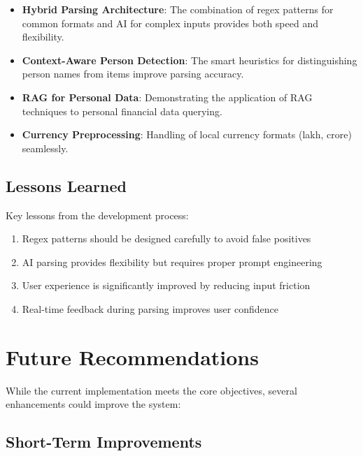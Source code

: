 \begin{itemize}
    \item \textbf{Hybrid Parsing Architecture}: The combination of regex patterns for common formats and AI for complex inputs provides both speed and flexibility.
    
    \item \textbf{Context-Aware Person Detection}: The smart heuristics for distinguishing person names from items improve parsing accuracy.
    
    \item \textbf{RAG for Personal Data}: Demonstrating the application of RAG techniques to personal financial data querying.
    
    \item \textbf{Currency Preprocessing}: Handling of local currency formats (lakh, crore) seamlessly.
\end{itemize}

\subsection{Lessons Learned}

Key lessons from the development process:

\begin{enumerate}
    \item Regex patterns should be designed carefully to avoid false positives
    \item AI parsing provides flexibility but requires proper prompt engineering
    \item User experience is significantly improved by reducing input friction
    \item Real-time feedback during parsing improves user confidence
\end{enumerate}

\section{Future Recommendations}

While the current implementation meets the core objectives, several enhancements could improve the system:

\subsection{Short-Term Improvements}


